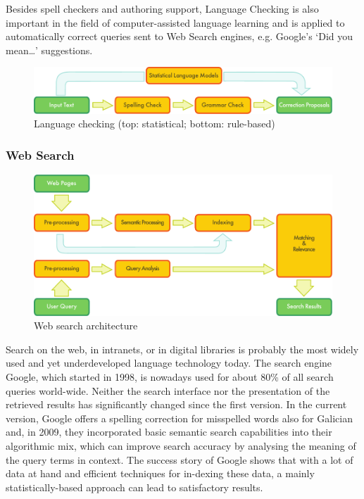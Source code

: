 \begin{multicols}{2}
\begin{itemize}
\begin{multicols}{2}
Besides spell checkers and authoring support, Language Checking is also important in the field of computer-assisted language learning and is applied to automatically correct queries sent to Web Search engines, e.g. Google’s ‘Did you mean…’ suggestions. 

\begin{figure}[htb]
  \center
  \includegraphics[width=\textwidth]{../_media/english/language_checking}
  \caption{Language checking (top: statistical; bottom: rule-based)}
  \label{fig:langcheckingaarch_en}
\end{figure}


\subsubsection{Web Search}

\begin{figure}[htb]
  \center
  \includegraphics[width=\textwidth]{../_media/english/web_search_architecture}
  \caption{Web search architecture}
  \label{fig:websearcharch_en}
 \end{figure}

   Search on the web, in intranets, or in digital libraries is probably the most widely used and yet underdeveloped language technology today. The search engine Google, which started in 1998, is nowadays used for about 80\% of all search queries world-wide. Neither the search interface nor the presentation of the retrieved results has significantly changed since the first version. In the current version, Google offers a spelling correction for misspelled words also for Galician and, in 2009, they incorporated basic semantic search capabilities into their algorithmic mix, which can improve search accuracy by analysing the meaning of the query terms in context. The success story of Google shows that with a lot of data at hand and efficient techniques for in-dexing these data, a mainly statistically-based approach can lead to satisfactory results. 


\end{multicols}
\end{itemize}
\end{multicols}
